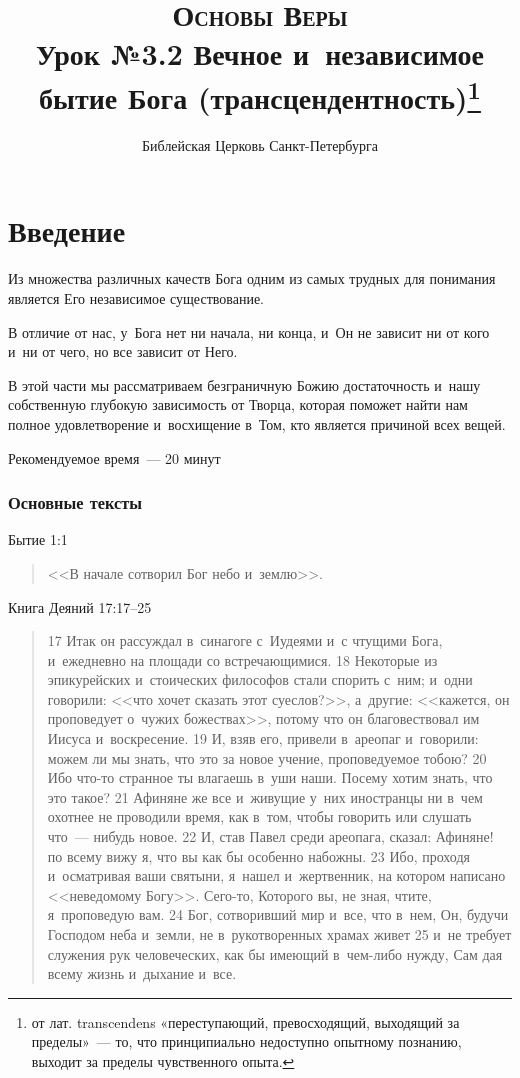 \documentclass[a4paper,12pt]{article}
\title{\textsc{Основы Веры}\\Урок №3.2 Вечное и~независимое бытие Бога (трансцендентность)\footnote{от лат. transcendens «переступающий, превосходящий, выходящий за пределы»~--- то, что принципиально недоступно опытному познанию, выходит за пределы чувственного опыта.} }
\author{Библейская Церковь Санкт-Петербурга}
\date{}
\begin{document}
\maketitle

\thispagestyle{empty}

\tableofcontents



\section{Введение}

Из множества различных качеств Бога одним из самых трудных для понимания является Его независимое существование.

В отличие от нас, у~Бога нет ни начала, ни конца, и~Он не зависит ни от кого и~ни от чего, но все зависит от Него.

В этой части мы рассматриваем безграничную Божию достаточность и~нашу собственную глубокую зависимость от Творца, которая поможет найти нам полное удовлетворение и~восхищение в~Том, кто является причиной всех вещей.

Рекомендуемое время~--- 20 минут
        
\subsubsection*{Основные тексты}

Бытие 1:1

\begin{quote}
    <<В начале сотворил Бог небо и~землю>>.
\end{quote}

Книга Деяний 17:17--25

\begin{quote}
17 Итак он рассуждал в~синагоге с~Иудеями и~с чтущими Бога, и~ежедневно на площади со встречающимися. 
18 Некоторые из эпикурейских и~стоических философов стали спорить с~ним; и~одни говорили: <<что хочет сказать этот суеслов?>>, а~другие: <<кажется, он проповедует о~чужих божествах>>, потому что он благовествовал им Иисуса и~воскресение. 
19 И, взяв его, привели в~ареопаг и~говорили: можем ли мы знать, что это за новое учение, проповедуемое тобою? 
20 Ибо что-то странное ты влагаешь в~уши наши. Посему хотим знать, что это такое? 
21 Афиняне же все и~живущие у~них иностранцы ни в~чем охотнее не проводили время, как в~том, чтобы говорить или слушать что~--- нибудь новое. 
22 И, став Павел среди ареопага, сказал: Афиняне! по всему вижу я, что вы как бы особенно набожны. 
23 Ибо, проходя и~осматривая ваши святыни, я~нашел и~жертвенник, на котором написано <<неведомому Богу>>. Сего-то, Которого вы, не зная, чтите, я~проповедую вам. 
24 Бог, сотворивший мир и~все, что в~нем, Он, будучи Господом неба и~земли, не в~рукотворенных храмах живет 
25 и~не требует служения рук человеческих, как бы имеющий в~чем-либо нужду, Сам дая всему жизнь и~дыхание и~все.
\end{quote}
\end{document}
